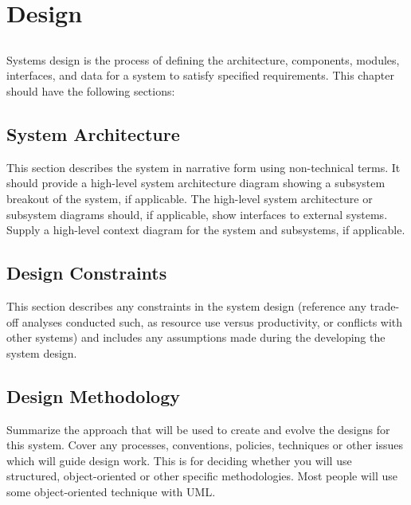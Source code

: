 \chapter{Design} \label{chap:design}


\section*{}

Systems design is the process of defining the architecture, components, modules, interfaces, and data for a system to satisfy specified requirements. This chapter should have the following sections:

\section{System Architecture}
This section describes the system in narrative form using non-technical terms.  It should provide a high-level system architecture diagram showing a subsystem breakout of the system, if applicable.  The high-level system architecture or subsystem diagrams should, if applicable, show interfaces to external systems.  Supply a high-level context diagram for the system and subsystems, if applicable.  
\section{Design Constraints}

This section describes any constraints in the system design (reference any trade-off analyses conducted such, as resource use versus productivity, or conflicts with other systems) and includes any assumptions made during the developing the system design.
\section{Design Methodology}

Summarize the approach that will be used to create and evolve the designs for this system. Cover any processes, conventions, policies, techniques or other issues which will guide design work. This is for deciding whether you will use structured, object-oriented or other specific methodologies.  Most people will use some object-oriented technique with UML.

